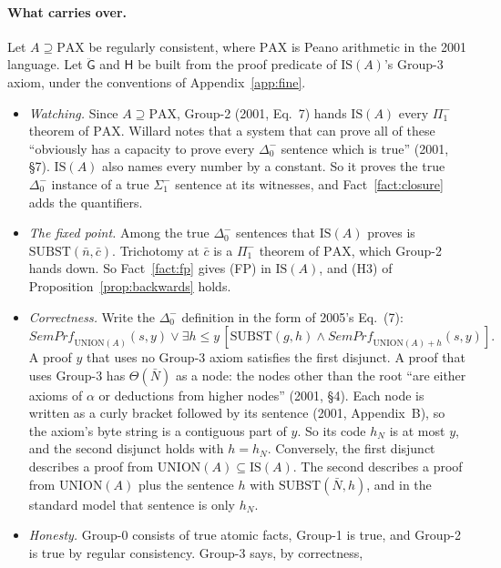 \documentclass[11pt]{article}
\newcommand{\G}{\ddot{\mathsf{G}}}          %
\newcommand{\Hs}{\mathsf{H}}                %
\newcommand{\Subst}{\mathrm{SUBST}}
\theoremstyle{plain}
\theoremstyle{definition}
\begin{document}
\paragraph{What carries over.} Let $A \supseteq \mathrm{PAX}$ be regularly
consistent, where $\mathrm{PAX}$ is Peano arithmetic in the 2001 language. Let
$\G$ and $\Hs$ be built from the proof predicate of $\mathrm{IS}(A)$'s
Group-3 axiom, under the conventions of Appendix~\ref{app:fine}.
\begin{itemize}[leftmargin=1.5em]
\item \emph{Watching.} Since $A \supseteq \mathrm{PAX}$, Group-2 (2001,
  Eq.~7) hands $\mathrm{IS}(A)$ every $\Pi_1^-$ theorem of $\mathrm{PAX}$.
  Willard notes that a system that can prove all of these ``obviously has a
  capacity to prove every $\Delta_0^-$ sentence which is true'' (2001, \S7).
  $\mathrm{IS}(A)$ also names every number by a constant. So it proves the
  true $\Delta_0^-$ instance of a true $\Sigma_1^-$ sentence at its witnesses,
  and Fact~\ref{fact:closure} adds the quantifiers.
\item \emph{The fixed point.} Among the true $\Delta_0^-$ sentences that
  $\mathrm{IS}(A)$ proves is $\Subst(\bar n, \bar c)$. Trichotomy at $\bar c$
  is a $\Pi_1^-$ theorem
  of $\mathrm{PAX}$, which Group-2 hands down. So Fact~\ref{fact:fp} gives
  (FP) in $\mathrm{IS}(A)$, and (H3) of Proposition~\ref{prop:backwards}
  holds.
\item \emph{Correctness.} Write the $\Delta_0^-$ definition in the form of
  2005's Eq.~(7):
  \[
  \mathit{SemPrf}_{\mathrm{UNION}(A)}(s,y) \vee \exists h \le y\,[\Subst(g,h)
  \wedge \mathit{SemPrf}_{\mathrm{UNION}(A)+h}(s,y)].
  \]
  A proof $y$ that uses no Group-3 axiom satisfies the first disjunct. A proof
  that uses Group-3 has $\Theta(\bar N)$ as a node: the nodes other than the
  root ``are either axioms of $\alpha$ or deductions from higher nodes''
  (2001, \S4). Each node is written as a curly bracket followed by its
  sentence (2001, Appendix~B), so the axiom's byte string is a contiguous part
  of $y$. So its code $h_N$ is at most $y$, and the second disjunct holds with
  $h = h_N$. Conversely, the first disjunct describes a proof from
  $\mathrm{UNION}(A) \subseteq \mathrm{IS}(A)$. The second describes a proof
  from $\mathrm{UNION}(A)$ plus the sentence $h$ with $\Subst(\bar N, h)$, and
  in the standard model that sentence is only $h_N$.
\item \emph{Honesty.} Group-0 consists of true atomic facts, Group-1 is true,
  and Group-2 is true by regular consistency. Group-3 says, by correctness,

\end{itemize}
\end{document}
